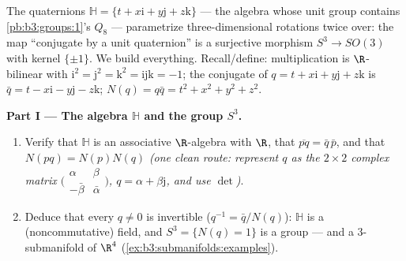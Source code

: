 \begin{problem}\label{pb:b3:submanifolds:1}
The quaternions $\mathbb H = \{t + x\mathrm i + y\mathrm j +
z\mathrm k\}$ --- the algebra whose unit group contains
\cref{pb:b3:groups:1}'s $Q_8$ --- parametrize
three-dimensional rotations twice over: the map ``conjugate
by a unit quaternion'' is a surjective morphism $S^3 \to
SO(3)$ with kernel $\{\pm1\}$. We build everything.
Recall/define: multiplication is $\R$-bilinear with
$\mathrm i^2 = \mathrm j^2 = \mathrm k^2 =
\mathrm{ijk} = -1$; the conjugate of $q = t + x\mathrm i +
y\mathrm j + z\mathrm k$ is $\bar q = t - x\mathrm i -
y\mathrm j - z\mathrm k$; $N(q) = q\bar q = t^2 + x^2 + y^2
+ z^2$.

\medskip
\noindent\textbf{Part I --- The algebra $\mathbb H$ and the
group $S^3$.}
\begin{enumerate}
  \item Verify that $\mathbb H$ is an associative
        $\R$-algebra with  $\R$, that $\overline{pq} =
        \bar q\,\bar p$, and that $N(pq) = N(p)N(q)$
        \emph{(one clean route: represent $q$ as the
        $2\times2$ complex matrix
        $\bigl(\begin{smallmatrix}\alpha & \beta\\
        -\bar\beta & \bar\alpha\end{smallmatrix}\bigr)$, $q =
        \alpha + \beta\mathrm j$, and use $\det$)}.
  \item Deduce that every $q \neq 0$ is invertible ($q^{-1} =
        \bar q/N(q)$): $\mathbb H$ is a (noncommutative)
        field, and $S^3 = \{N(q) = 1\}$ is a group ---
        and a  $3$-submanifold of $\R^4$
        (\cref{ex:b3:submanifolds:examples}).
\end{enumerate}


\end{problem}
